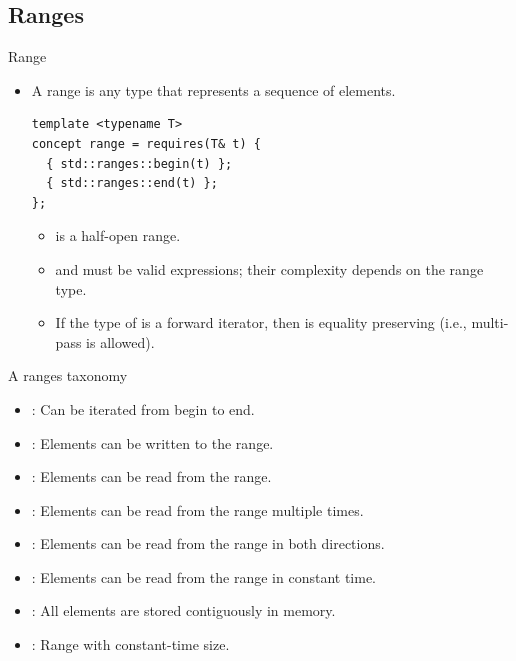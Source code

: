 \subsection{Ranges}

\begin{frame}[t,fragile]{Range}
\begin{itemize}
  \item A range is any type that represents a sequence of elements.
\begin{lstlisting}
template <typename T>
concept range = requires(T& t) {
  { std::ranges::begin(t) };
  { std::ranges::end(t) };
};
\end{lstlisting}
    \begin{itemize}
      \item \cppcode{[std::ranges::begin(t), std::ranges::end(t))} is a half-open range.
      \item {} and  must be valid expressions; their complexity depends on the range type.
      \item If the type of  is a forward iterator, then \cppcode{[std::ranges::begin(t), std::ranges::end(t))} is equality preserving (i.e., multi-pass is allowed).
    \end{itemize}
\end{itemize}
\end{frame}

\begin{frame}[t,fragile]{A ranges taxonomy}
\begin{itemize}
  \item {}: Can be iterated from begin to end.
  \item {}: Elements can be written to the range.
  \item {}: Elements can be read from the range.
  \item {}: Elements can be read from the range multiple times.
  \item {}: Elements can be read from the range in both directions.
  \item {}: Elements can be read from the range in constant time.
  \item {}: All elements are stored contiguously in memory.
  \item {}: Range with constant-time size.
\end{itemize}
\end{frame}

